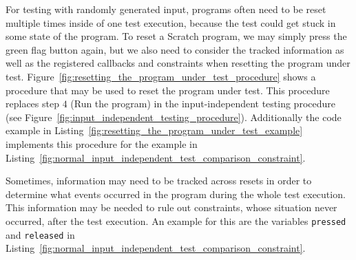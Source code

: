 For testing with randomly generated input, programs often need to be reset multiple times inside of one test execution,
because the test could get stuck in some state of the program.
To reset a Scratch program, we may simply press the green flag button again,
but we also need to consider the tracked information as well as the registered callbacks and constraints when resetting the program under test.
Figure~\ref{fig:resetting_the_program_under_test_procedure} shows a procedure that may be used to reset the program under test.
This procedure replaces step $4$ (Run the program) in the input-independent testing procedure (see Figure~\ref{fig:input_independent_testing_procedure}).
Additionally the code example in Listing~\ref{fig:resetting_the_program_under_test_example}
implements this procedure for the example in Listing~\ref{fig:normal_input_independent_test_comparison_constraint}.
\parspace

Sometimes, information may need to be tracked across resets in order to determine what events occurred in the program during the whole test execution.
This information may be needed to rule out constraints, whose situation never occurred, after the test execution.
An example for this are the variables \texttt{pressed} and \texttt{released} in Listing~\ref{fig:normal_input_independent_test_comparison_constraint}.

